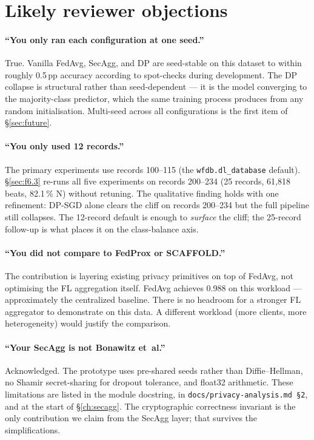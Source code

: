 \documentclass[11pt,a4paper]{report}
\begin{document}
\section{Likely reviewer objections}

\paragraph{``You only ran each configuration at one seed.''}
True. Vanilla FedAvg, SecAgg, and DP are seed-stable on this dataset to
within roughly 0.5\,pp accuracy according to spot-checks during
development. The DP collapse is structural rather than seed-dependent
--- it is the model converging to the majority-class predictor, which
the same training process produces from any random initialisation. Multi-seed
across all configurations is the first item of \S\ref{sec:future}.

\paragraph{``You only used 12 records.''}
The primary experiments use records 100--115 (the
\texttt{wfdb.dl\_database} default). \S\ref{sec:f6.3} re-runs all
five experiments on records 200--234 (25 records, 61{,}818 beats,
82.1\,\% N) without retuning. The qualitative finding holds with one
refinement: DP-SGD alone clears the cliff on records 200--234 but the
full pipeline still collapses. The 12-record default is enough to
\emph{surface} the cliff; the 25-record follow-up is what places it
on the class-balance axis.

\paragraph{``You did not compare to FedProx or SCAFFOLD.''}
The contribution is layering existing privacy primitives on top of
FedAvg, not optimising the FL aggregation itself. FedAvg achieves
0.988 on this workload --- approximately the centralized baseline.
There is no headroom for a stronger FL aggregator to demonstrate on
this data. A different workload (more clients, more heterogeneity)
would justify the comparison.

\paragraph{``Your SecAgg is not Bonawitz et~al.''}
Acknowledged. The prototype uses pre-shared seeds rather than
Diffie--Hellman, no Shamir secret-sharing for dropout tolerance,
and float32 arithmetic. These limitations are listed in the
module docstring, in
\texttt{docs/privacy-analysis.md\,\S2}, and at the start of
\S\ref{ch:secagg}. The cryptographic correctness invariant is the
only contribution we claim from the SecAgg layer; that survives the
simplifications.
\end{document}
